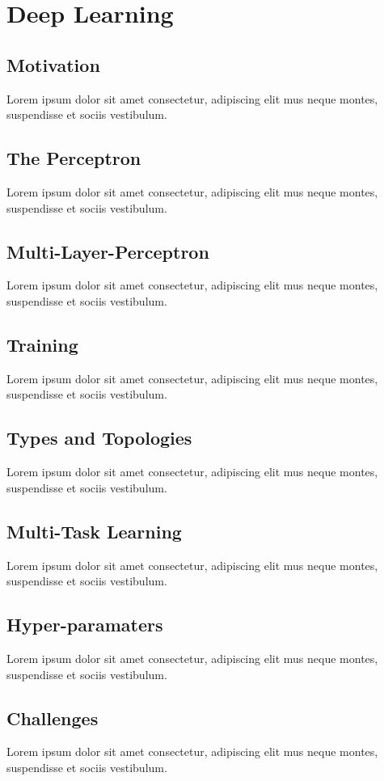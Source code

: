 \section{Deep Learning}
\subsection{Motivation}
Lorem ipsum dolor sit amet consectetur, adipiscing elit mus neque montes, suspendisse et sociis vestibulum.

\subsection{The Perceptron}
Lorem ipsum dolor sit amet consectetur, adipiscing elit mus neque montes, suspendisse et sociis vestibulum.

\subsection{Multi-Layer-Perceptron}
Lorem ipsum dolor sit amet consectetur, adipiscing elit mus neque montes, suspendisse et sociis vestibulum.

\subsection{Training}
Lorem ipsum dolor sit amet consectetur, adipiscing elit mus neque montes, suspendisse et sociis vestibulum.

\subsection{Types and Topologies}
Lorem ipsum dolor sit amet consectetur, adipiscing elit mus neque montes, suspendisse et sociis vestibulum.

\subsection{Multi-Task Learning}
Lorem ipsum dolor sit amet consectetur, adipiscing elit mus neque montes, suspendisse et sociis vestibulum.

\subsection{Hyper-paramaters}
Lorem ipsum dolor sit amet consectetur, adipiscing elit mus neque montes, suspendisse et sociis vestibulum.

\subsection{Challenges}
Lorem ipsum dolor sit amet consectetur, adipiscing elit mus neque montes, suspendisse et sociis vestibulum.


